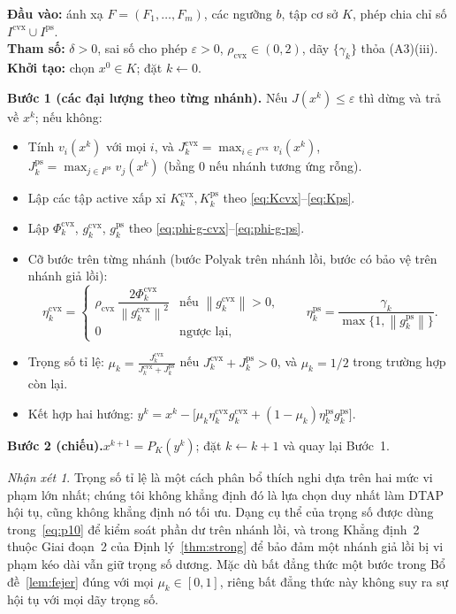 \documentclass[]{interact}
\theoremstyle{plain}
\theoremstyle{definition}
\theoremstyle{remark}
\newtheorem{remark}{Nhận xét}
\newcommand{\algstep}[1]{\smallskip\noindent\textbf{#1}}
\newcommand{\norm}[1]{\left\lVert #1 \right\rVert}
\newcommand{\cvx}{\mathrm{cvx}}
\newcommand{\ps}{\mathrm{ps}}
\begin{document}
\begin{algorithm}[H]
\caption{Chiếu Thích nghi Hai Nhánh (DTAP) cho NSFP với hộp chuẩn
\eqref{eq:nsfp-box}.}
\label{alg:dtap}
\small
\noindent\textbf{Đầu vào:} ánh xạ $F=(F_1,\dots,F_m)$, các ngưỡng $b$, tập cơ sở $K$, phép chia
chỉ số $I^{\cvx}\cup I^{\ps}$.\\
\textbf{Tham số:} $\delta>0$, sai số cho phép $\varepsilon>0$, $\rho_{\cvx}\in(0,2)$,
dãy $\{\gamma_k\}$ thỏa (A3)(iii).\\
\textbf{Khởi tạo:} chọn $x^0\in K$; đặt $k\leftarrow 0$.

\algstep{Bước 1 (các đại lượng theo từng nhánh).} Nếu $J(x^k)\le\varepsilon$ thì dừng và trả về $x^k$; nếu không:
\begin{itemize}[leftmargin=1.6em,itemsep=1pt,topsep=2pt]
\item[(1a)] Tính $v_i(x^k)$ với mọi $i$, và $J^{\cvx}_k=\max_{i\in I^{\cvx}}v_i(x^k)$,
$J^{\ps}_k=\max_{j\in I^{\ps}}v_j(x^k)$ (bằng $0$ nếu nhánh tương ứng rỗng).
\item[(1b)] Lập các tập active xấp xỉ $K^{\cvx}_k,K^{\ps}_k$ theo
\eqref{eq:Kcvx}--\eqref{eq:Kps}.
\item[(1c)] Lập $\Phi^{\cvx}_k$, $g^{\cvx}_k$, $g^{\ps}_k$ theo
\eqref{eq:phi-g-cvx}--\eqref{eq:phi-g-ps}.
\item[(1d)] Cỡ bước trên từng nhánh (bước Polyak trên nhánh lồi, bước có bảo vệ trên
nhánh giả lồi):
\[
\eta^{\cvx}_k=\begin{cases}\rho_{\cvx}\,\dfrac{2\Phi^{\cvx}_k}{\norm{g^{\cvx}_k}^2} & \text{nếu }\norm{g^{\cvx}_k}>0,\\ 0 & \text{ngược lại,}\end{cases}
\qquad
\eta^{\ps}_k=\frac{\gamma_k}{\max\{1,\norm{g^{\ps}_k}\}} .
\]
\item[(1e)] Trọng số tỉ lệ:
$\displaystyle \mu_k=\frac{J^{\cvx}_k}{J^{\cvx}_k+J^{\ps}_k}$ nếu
$J^{\cvx}_k+J^{\ps}_k>0$, và $\mu_k=1/2$ trong trường hợp còn lại.
\item[(1f)] Kết hợp hai hướng:
$\displaystyle y^k=x^k-\bigl[\mu_k\eta^{\cvx}_k g^{\cvx}_k+(1-\mu_k)\eta^{\ps}_k g^{\ps}_k\bigr].$
\end{itemize}
\algstep{Bước 2 (chiếu).}\quad $x^{k+1}=P_K(y^k)$; đặt $k\leftarrow k+1$ và quay lại Bước~1.
\end{algorithm}

\begin{remark}\label{rem:weight-scope}
Trọng số tỉ lệ là một cách phân bổ thích nghi dựa trên hai mức vi phạm lớn nhất;
chúng tôi không khẳng định đó là lựa chọn duy nhất làm DTAP hội tụ, cũng không khẳng định nó tối ưu.
Dạng cụ thể của trọng số được dùng trong~\eqref{eq:p10} để kiểm soát phần dư trên nhánh lồi, và trong
Khẳng định~2 thuộc Giai đoạn~2 của Định lý~\ref{thm:strong} để bảo đảm một nhánh giả lồi
bị vi phạm kéo dài vẫn giữ trọng số dương. Mặc dù bất đẳng thức một bước trong Bổ đề~\ref{lem:fejer} đúng
với mọi $\mu_k\in[0,1]$, riêng bất đẳng thức này không suy ra sự hội tụ với mọi dãy trọng số.
\end{remark}
\end{document}
